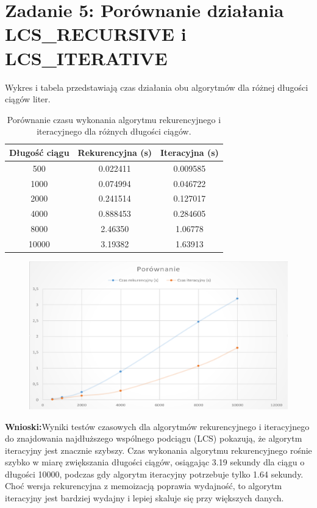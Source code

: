 \documentclass{article}
\theoremstyle{definition}
\begin{document}
	\section{Zadanie 5:  Porównanie działania LCS\_RECURSIVE i LCS\_ITERATIVE}
	Wykres i tabela przedstawiają czas działania obu algorytmów dla różnej długości ciągów liter.
	\begin{table}[H]
		\centering
		\begin{tabular}{|c|c|c|}
			\hline
			\textbf{Długość ciągu} & \textbf{Rekurencyjna (s)} & \textbf{Iteracyjna (s)} \\ \hline
			500  & 0.022411 & 0.009585 \\ \hline
			1000 & 0.074994 & 0.046722 \\ \hline
			2000 & 0.241514 & 0.127017 \\ \hline
			4000 & 0.888453 & 0.284605 \\ \hline
			8000 & 2.46350  & 1.06778  \\ \hline
			10000 & 3.19382  & 1.63913  \\ \hline
		\end{tabular}
		\caption{Porównanie czasu wykonania algorytmu rekurencyjnego i iteracyjnego dla różnych długości ciągów.}
		\label{tab:czas_algorytmy}
	\end{table}
	\begin{figure}[H]	
		\centering
		\includegraphics[width=1.0\textwidth]{w1.png} 
	\end{figure}
	\textbf{Wnioski:}Wyniki testów czasowych dla algorytmów rekurencyjnego i iteracyjnego do znajdowania najdłuższego wspólnego podciągu (LCS) pokazują, że algorytm iteracyjny jest znacznie szybszy. Czas wykonania algorytmu rekurencyjnego rośnie szybko w miarę zwiększania długości ciągów, osiągając 3.19 sekundy dla ciągu o długości 10000, podczas gdy algorytm iteracyjny potrzebuje tylko 1.64 sekundy. Choć wersja rekurencyjna z memoizacją poprawia wydajność, to algorytm iteracyjny jest bardziej wydajny i lepiej skaluje się przy większych danych.
\end{document}
